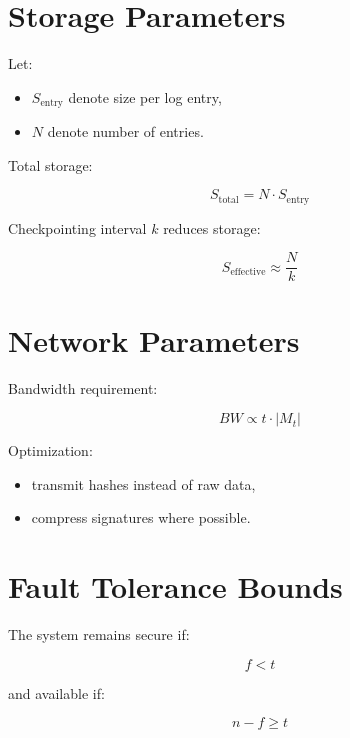 \section{Storage Parameters}

Let:

\begin{itemize}
\item $S_{\text{entry}}$ denote size per log entry,
\item $N$ denote number of entries.
\end{itemize}

Total storage:

\begin{equation}
S_{\text{total}} = N \cdot S_{\text{entry}}
\end{equation}

Checkpointing interval $k$ reduces storage:

\begin{equation}
S_{\text{effective}} \approx \frac{N}{k}
\end{equation}

\section{Network Parameters}

Bandwidth requirement:

\begin{equation}
BW \propto t \cdot |M_t|
\end{equation}

Optimization:

\begin{itemize}
\item transmit hashes instead of raw data,
\item compress signatures where possible.
\end{itemize}

\section{Fault Tolerance Bounds}

The system remains secure if:

\begin{equation}
f < t
\end{equation}

and available if:

\begin{equation}
n - f \geq t
\end{equation}

